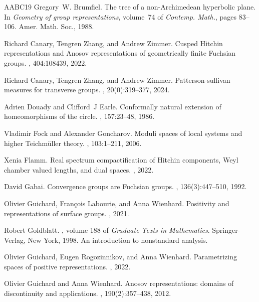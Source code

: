 \documentclass{amsart}
\theoremstyle{plain}
\theoremstyle{definition}
\newcommand{\1}{\mathbf{1}}
\begin{document}
\begin{thebibliography}{AABC{\etalchar{+}}19}
Gregory~W. Brumfiel.
\newblock The tree of a non-{A}rchimedean hyperbolic plane.
\newblock In {\em Geometry of group representations}, volume~74 of {\em
  Contemp. Math.}, pages 83--106. Amer. Math. Soc., 1988.

Richard Canary, Tengren Zhang, and Andrew Zimmer.
\newblock Cusped {H}itchin representations and {A}nosov representations of
  geometrically finite {F}uchsian groups.
, 404:108439, 2022.

Richard Canary, Tengren Zhang, and Andrew Zimmer.
\newblock Patterson-sullivan measures for transverse groups.
, 20(0):319--377, 2024.

Adrien Douady and Clifford~J Earle.
\newblock Conformally natural extension of homeomorphisms of the circle.
, 157:23--48, 1986.

Vladimir Fock and Alexander Goncharov.
\newblock Moduli spaces of local systems and higher {T}eichm{\"u}ller theory.
, 103:1--211, 2006.

Xenia Flamm.
\newblock Real spectrum compactification of {Hitchin} components, {Weyl}
  chamber valued lengths, and dual spaces.
, 2022.

David Gabai.
\newblock Convergence groups are {F}uchsian groups.
, 136(3):447--510, 1992.

Olivier Guichard, Fran{\c{c}}ois Labourie, and Anna Wienhard.
\newblock Positivity and representations of surface groups.
, 2021.

Robert Goldblatt.
, volume 188 of {\em Graduate Texts
  in Mathematics}.
\newblock Springer-Verlag, New York, 1998.
\newblock An introduction to nonstandard analysis.

Olivier Guichard, Eugen Rogozinnikov, and Anna Wienhard.
\newblock Parametrizing spaces of positive representations.
, 2022.

Olivier Guichard and Anna Wienhard.
\newblock Anosov representations: domains of discontinuity and applications.
, 190(2):357--438, 2012.


\end{thebibliography}
\end{document}
